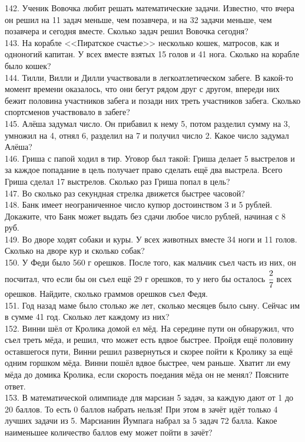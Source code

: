 142. Ученик Вовочка любит решать математические задачи. Известно, что вчера он решил на 11 задач меньше, чем позавчера, и на 32 задачи меньше, чем позавчера и сегодня вместе. Сколько задач решил Вовочка сегодня?\\
143. На корабле <<Пиратское счастье>> несколько кошек, матросов, как и одноногий капитан. У всех вместе взятых 15 голов и 41 нога. Сколько на корабле было кошек?\\
144. Тилли, Вилли и Дилли участвовали в легкоатлетическом забеге. В какой-то момент времени оказалось, что они бегут рядом друг с другом, впереди них бежит половина участников забега и позади них треть участников забега. Сколько спортсменов участвовало в забеге?\\
145. Алёша задумал число. Он прибавил к нему 5, потом разделил сумму на 3, умножил на 4, отнял 6, разделил на 7 и получил число 2. Какое число задумал Алёша?\\
146. Гриша с папой ходил в тир. Уговор был такой: Гриша делает 5 выстрелов и за каждое попадание в цель получает право сделать ещё два выстрела. Всего Гриша сделал 17 выстрелов. Сколько раз Гриша попал в цель?\\
147. Во сколько раз секундная стрелка движется быстрее часовой?\\
148. Банк имеет неограниченное число купюр достоинством 3 и 5 рублей.  Докажите, что Банк может выдать без сдачи любое число рублей, начиная с 8 руб.\\
149. Во дворе ходят собаки и куры. У всех животных вместе 34 ноги и 11 голов. Сколько на дворе кур и сколько собак?\\
150. У Феди было 560 г орешков. После того, как мальчик съел часть из них, он посчитал, что если бы он съел ещё 29 г орешков, то у него бы осталось $\cfrac{2}{7}$ всех орешков. Найдите, сколько граммов орешков съел Федя.\\
151. Год назад маме было столько же лет, сколько месяцев было сыну. Сейчас им в сумме 41 год. Сколько лет каждому из них?\\
152. Винни шёл от Кролика домой  ел мёд. На середине пути он обнаружил, что съел треть мёда, и решил, что может есть вдвое быстрее. Пройдя ещё половину оставшегося пути, Винни решил развернуться и скорее пойти к Кролику за ещё одним горшком мёда. Винни пошёл вдвое быстрее, чем раньше. Хватит ли ему мёда до домика Кролика, если скорость поедания мёда он не менял? Поясните ответ.\\
153. В математической олимпиаде для марсиан 5 задач, за каждую дают от 1 до 20 баллов. То есть 0 баллов набрать нельзя! При этом в зачёт идёт только 4 лучших задачи из 5. Марсианин Йумпага набрал за 5 задач 72 балла. Какое наименьшее количество баллов ему может пойти в зачёт?\\
